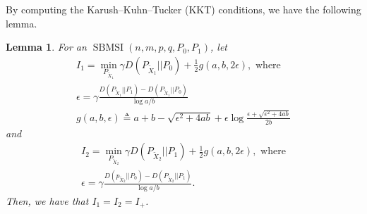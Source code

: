 \documentclass[conference]{IEEEtran}
\newtheorem{lemma}{Lemma}
\DeclareMathOperator{\SBMSI}{SBMSI}
\begin{document}
	By computing the Karush–Kuhn–Tucker (KKT) conditions, we have the following lemma. %
	\begin{lemma}\label{lem:p0p12}
		For an $\SBMSI(n,m,p,q,P_0,P_1)$, let
		\begin{align}
			I_1=\min_{P_{\widetilde{X}_1}} \gamma D(P_{\widetilde{X}_1}|| P_0)+ \frac{1}{2} g(a,b, 2\epsilon),\text{ where}\nonumber\\
			\epsilon = \gamma \frac{D(P_{\widetilde{X}_1} || P_1) - D(P_{\widetilde{X}_1} || P_0) }{\log a /b}\label{eq:I1}\\
	   g(a,b,\epsilon) \triangleq a + b - \sqrt{\epsilon^2 + 4ab} + \epsilon \log \frac{\epsilon + \sqrt{\epsilon^2 + 4ab}}{2b}\label{equation:g}
		\end{align}
		and
		\begin{align}
			I_2=\min_{P_{\widetilde{X}_2}} \gamma D(P_{\widetilde{X}_2}|| P_1)+ \frac{1}{2} g(a,b, 2\epsilon),\text{ where}\nonumber\\
			\epsilon = \gamma \frac{D(p_{\widetilde{X}_2} || P_0) - D(P_{\widetilde{X}_2} || P_1) }{\log a /b}.\label{eq:I2}
		\end{align}
 		Then, we have that $I_1=I_2=I_+$. 
	\end{lemma}
\end{document}
